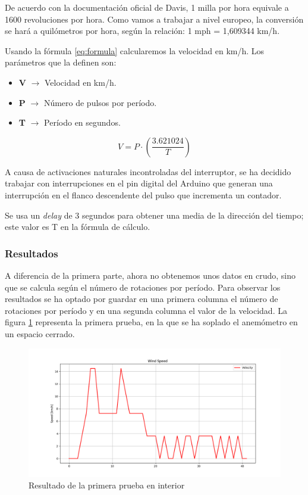 \documentclass[a4paper, 11pt]{article}
\begin{document}
De acuerdo con la documentación oficial de Davis, 1 milla por hora equivale a 1600 revoluciones por hora. Como vamos a trabajar a nivel europeo, la conversión se hará a quilómetros por hora, según la relación: 1 mph = 1,609344 km/h.

Usando la fórmula \ref{eq:formula} calcularemos la velocidad en km/h. Los parámetros que la definen son:

\begin{itemize}
	\item \textbf{V} $\rightarrow$ Velocidad en km/h.
	\item \textbf{P} $\rightarrow$ Número de pulsos por período.
	\item \textbf{T} $\rightarrow$ Período en segundos. 
\end{itemize}

\begin{equation} 
V = P \cdot \left(\frac{3.621024}{T}\right)
\label{eq:formula}
\end{equation}

A causa de activaciones naturales incontroladas del interruptor, se ha decidido trabajar con interrupciones en el pin digital del Arduino que generan una interrupción en el flanco descendente del pulso que incrementa un contador.

Se usa un \textit{delay} de 3 segundos para obtener una media de la dirección del tiempo; este valor es T en la fórmula de cálculo. 

\subsubsection{Resultados}
A diferencia de la primera parte, ahora no obtenemos unos datos en crudo, sino que se calcula según el número de rotaciones por período. Para observar los resultados se ha optado por guardar en una primera columna el número de rotaciones por período y en una segunda columna el valor de la velocidad. La figura \ref{fig:testvelocity1} representa la primera prueba, en la que se ha soplado el anemómetro en un espacio cerrado.

\begin{figure}[h]
	\center
	\includegraphics[width=1\textwidth]{img/testVelocityInEN.png}
	\caption{Resultado de la primera prueba en interior}
	\label{fig:testvelocity1}
\end{figure}
\newpage
\end{document}
